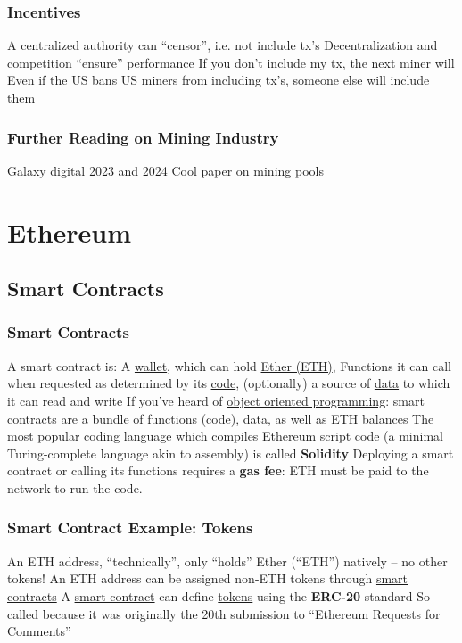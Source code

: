 \documentclass[aspectratio=169]{beamer}
\begin{document}
\begin{frame}
\frametitle{Incentives}

\bi
\m A centralized authority can ``censor'', i.e. not include tx's
\m Decentralization and competition ``ensure'' performance
\bi
\m If you don't include my tx, the next miner will
\m Even if the US bans US miners from including tx's, someone else will include them
\ei
\ei

\end{frame}


\begin{frame}
\frametitle{Further Reading on Mining Industry}

\bi
\m Galaxy digital \href{https://www.galaxy.com/insights/research/2023-mid-year-mining/}{2023} and \href{https://www.galaxy.com/insights/research/2024-mid-year-mining/}{2024}
\m Cool \href{https://zhiguohe.net/wp-content/uploads/2023/12/10914-hhaa040.pdf}{paper} on mining pools
\ei

\end{frame}


\section{Ethereum}

\subsection{Smart Contracts}




\begin{frame}
\frametitle{Smart Contracts}

\bi
\m A smart contract is:
\bi
\m A \ul{wallet}, which can hold \ul{Ether (ETH)},
\m Functions it can call when requested as determined by its \ul{code},
\m (optionally) a source of \ul{data} to which it can read and write \pause 
\ei
\m If you've heard of \ul{object oriented programming}: smart contracts are a bundle of functions (code), data, as well as ETH balances \pause
\m The most popular coding language which compiles Ethereum script code (a minimal Turing-complete language akin to assembly) is called \textbf{Solidity} \pause 
\ei
Deploying a smart contract or calling its functions requires a \textbf{gas fee}: ETH must be paid to the network to run the code. 

\end{frame}

\begin{frame}
\frametitle{Smart Contract Example: Tokens}

\bi
\m An ETH address, ``technically'', only ``holds'' Ether (``ETH'') natively -- no other tokens!
\m An ETH address can be assigned non-ETH tokens through \ul{smart contracts}
\m A \ul{smart contract} can define \ul{tokens} using the \textbf{ERC-20} standard 
\bi 
\m So-called because it was originally the 20th submission to ``Ethereum Requests for Comments'' 
\ei 
\ei

\end{frame}
\end{document}
